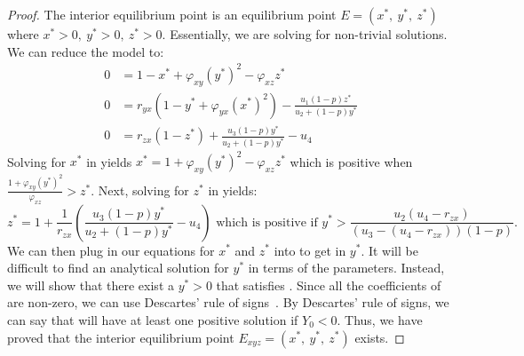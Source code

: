 \begin{proof}
    The interior equilibrium point is an equilibrium point $E=\left(x^*,\ y^*,\ z^*\right)$ where $x^*>0,\ y^*>0,\ z^*>0$. Essentially, we are solving  for non-trivial solutions. We can reduce the model to:
    \begin{subequations}\label{system:interior}
        \begin{align}
            0 &= 1-x^*+\varphi_{xy}\left(y^*\right)^2-\varphi_{xz}z^* \label{eq:interior-x}\\
            0 &= r_{yx}\left(1-y^*+\varphi_{yx}\left(x^*\right)^2\right)-\frac{u_1\left(1-p\right)z^*}{u_2+\left(1-p\right)y^*} \label{eq:interior-y}\\
            0 &= r_{zx}\left(1-z^*\right)+\frac{u_3\left(1-p\right)y^*}{u_2+\left(1-p\right)y^*}-u_4 \label{eq:interior-z}
        \end{align}
    \end{subequations}
    Solving for $x^*$ in  yields $x^*=1+\varphi_{xy}\left(y^*\right)^2-\varphi_{xz}z^*$ which is positive when $\frac{1+\varphi_{xy}\left(y^*\right)^2}{\varphi_{xz}}>z^*$. Next, solving for $z^*$ in  yields:
    \begin{equation*}
        z^*=1+\frac{1}{r_{zx}}\left(\frac{u_3\left(1-p\right)y^*}{u_2+\left(1-p\right)y^*}-u_4\right)\text{ which is positive if }y^*>\frac{u_2\left(u_4-r_{zx}\right)}{\left(u_3-\left(u_4-r_{zx}\right)\right)\left(1-p\right)}.
    \end{equation*}
    We can then plug in our equations for $x^*$ and $z^*$ into  to get  in $y^*$. It will be difficult to find an analytical solution for $y^*$ in terms of the parameters. Instead, we will show that there exist a $y^*>0$ that satisfies . Since all the coefficients of  are non-zero, we can use Descartes' rule of signs~\cite{WANG2004525526}. By Descartes' rule of signs, we can say that  will have at least one positive solution if $Y_0<0$. Thus, we have proved that the interior equilibrium point $E_{xyz}=\left(x^*,\ y^*,\ z^*\right)$ exists.
\end{proof}

